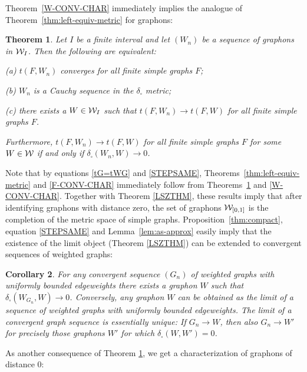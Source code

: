 \documentclass[12pt]{article}
\newtheorem{theorem}{Theorem}[section]
\newtheorem{corollary}[theorem]{Corollary}
\numberwithin{equation}{section}
\def\WWz{{\WW_{[0,1]}}}
\begin{document}
Theorem~\ref{W-CONV-CHAR} immediately implies the analogue
of Theorem~\ref{thm:left-equiv-metric} for graphons:

\begin{theorem}\label{LEFTCONV=DELTACONV}
Let $I$ be a finite interval and let $(W_n)$ be a sequence of
graphons in ${\cal W}_I$. Then the following are equivalent:

\smallskip

{\rm (a)} $t(F,W_n)$ converges for all finite simple graphs $F$;

\smallskip

{\rm (b)} $W_n$ is a Cauchy sequence in the $\delta_\square$ metric;

\smallskip

{\rm (c)} there exists a $W\in {\cal W}_I$ such that $t(F,W_n)\to t(F,W)$
for all finite simple graphs $F$.

\smallskip

Furthermore,  $t(F,W_n)\to t(F,W)$ for all finite simple graphs $F$
for some $W\in {\cal W}$ if and only if $\delta_\square(W_n,W)\to 0$.
\end{theorem}

Note that by equations \eqref{tG=tWG} and \eqref{STEPSAME},
Theorems~\ref{thm:left-equiv-metric} and \ref{F-CONV-CHAR}
immediately follow from Theorems~\ref{LEFTCONV=DELTACONV} and
\ref{W-CONV-CHAR}. Together with Theorem \ref{LSZTHM}, these
results imply that after identifying graphons with distance zero, the
set of graphons $\WWz$ is the completion of the metric space of
simple graphs. Proposition~\ref{thm:compact}, equation
\eqref{STEPSAME} and Lemma~\ref{lem:as-approx} easily imply that the
existence of the limit object (Theorem \ref{LSZTHM}) can be
extended to convergent sequences of weighted graphs:

\begin{corollary}\label{thm:LIMIT-EXIST}
For any convergent sequence $(G_n)$ of weighted graphs with
uniformly bounded edgeweights there exists a graphon $W$ such that
$\delta_\square(W_{G_n},W)\to 0$. Conversely, any graphon $W$ can be
obtained as the limit of a sequence of weighted graphs with
uniformly bounded edgeweights. The limit of a convergent graph
sequence is essentially unique: If $G_n\to W$, then also $G_n\to W'$
for precisely those graphons $W'$ for which
$\delta_\square(W,W')=0$.
\end{corollary}

As another consequence of Theorem \ref{LEFTCONV=DELTACONV}, we
get a characterization of graphons of distance $0$:
\end{document}
